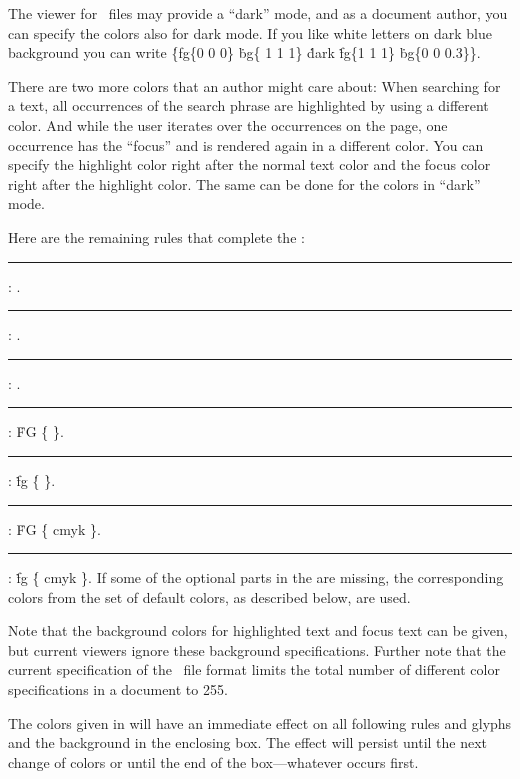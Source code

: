The viewer for \HINT\ files may provide a ``dark'' mode, and as a document
author, you can specify the colors also for dark mode.
If you like white letters on dark blue background you can write
\.{\{fg\{0 0 0\}} \.{bg\{ 1 1 1\}}
\.{dark} \.{fg\{1 1 1\}} \.{bg\{0 0 0.3\}\}}.

There are two more colors that an author might care about: When searching
for a text, all occurrences of the search phrase are highlighted by
using a different color. And while the user iterates over the occurrences
on the page, one occurrence has the ``focus'' and is rendered again in a
different color. You can specify the highlight color right after
the normal text color and the focus color right after the highlight color.
The same can be done for the colors in ``dark'' mode.

Here are the remaining rules that complete the :

\medskip
\rule{}:  .
\rule{}:
     .
\rule{}:
     .
\rule{}:
   \.{FG} \.{\{}      \.{\}}.
\rule{}:
   \.{fg} \.{\{}      \.{\}}.
\rule{}:
   \.{FG} \.{\{ cmyk}      \.{\}}.
\rule{}:
  \.{fg} \.{\{ cmyk}      \.{\}}.
\medskip
If some of the optional parts in the  are missing,
the corresponding colors from the set of default colors, as described below,
are used.

Note that the background colors for highlighted text and focus text
can be given, but current viewers ignore these background specifications.
Further note that the current specification of the \HINT\ file format
limits the total number of different color specifications in a document to 255.


The colors given in  will have an immediate effect
on all following rules and glyphs and the background in the enclosing box.
The effect will persist until the next change of colors or until
the end of the box---whatever occurs first.

